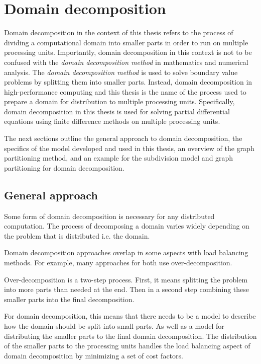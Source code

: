 \section{Domain decomposition}
Domain decomposition in the context of this thesis refers to the process of dividing a computational domain into smaller parts in order to run on multiple processing units.
Importantly, domain decomposition in this context is not to be confused with the \textit{domain decomposition method} in mathematics and numerical analysis.
The \textit{domain decomposition method} is used to solve boundary value problems by splitting them into smaller parts.
Instead, domain decomposition in high-performance computing and this thesis is the name of the process used to prepare a domain for distribution to multiple processing units.
Specifically, domain decomposition in this thesis is used for solving partial differential equations using finite difference methods on multiple processing units.

The next sections outline the general approach to domain decomposition, the specifics of the model developed and used in this thesis, an overview of the graph partitioning method, and an example for the subdivision model and graph partitioning for domain decomposition.

\subsection{General approach}
Some form of domain decomposition is necessary for any distributed computation.
The process of decomposing a domain varies widely depending on the problem that is distributed i.e. the domain.

Domain decomposition approaches overlap in some aspects with load balancing methods.
For example, many approaches for both use over-decomposition.

Over-decomposition is a two-step process.
First, it means splitting the problem into more parts than needed at the end.
Then in a second step combining these smaller parts into the final decomposition.

For domain decomposition, this means that there needs to be a model to describe how the domain should be split into small parts.
As well as a model for distributing the smaller parts to the final domain decomposition.
The distribution of the smaller parts to the processing units handles the load balancing aspect of domain decomposition by minimizing a set of cost factors.

